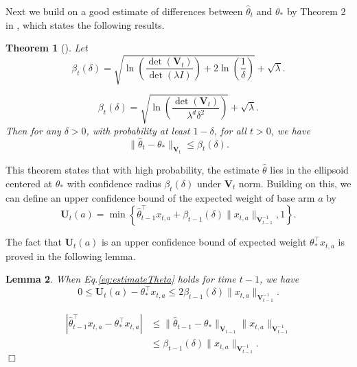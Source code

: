 \documentclass{article}
\newcommand{\bU}{\mathbf{U}}
\newcommand{\bV}{\mathbf{V}}
\newcommand{\abs}[1]{\left| #1 \right|}
\newcommand{\norm}[1]{\| #1 \|}
\newtheorem{theorem}{Theorem}[section]
\newtheorem{lemma}[theorem]{Lemma}%
\newenvironment{proof}{\noindent {\textbf{Proof. }}}{$\Box$ \medskip}
\newcommand{\wei}[1]{}
\newcommand{\wei}[1]{{\color{blue!50!black}  [\text{Wei:} #1]}}
\begin{document}
Next we build on a good estimate of differences between $\hat{\theta}_t$ and $\theta_*$ by Theorem 2 in \cite{abbasi2011improved}, which states the following results.
	
\begin{theorem}[\cite{abbasi2011improved}]
\label{thm:theta_estimate}
Let 
$$
\beta_{t}(\delta) = \sqrt{\ln\left(\frac{\det(\bV_{t})}{\det(\lambda I)}\right) + 2 \ln\left(\frac{1}{\delta}\right)} + \sqrt{\lambda}.
$$
\wei{I thought the following is simpler. Should we use the following?}
$$
\beta_{t}(\delta) = \sqrt{\ln\left(\frac{\det(\bV_{t})}{\lambda^d \delta^2}\right)} + \sqrt{\lambda}.
$$
Then for any $\delta > 0$, with probability at least $1 - \delta$, for all $t > 0$, we have
\begin{equation}
\label{eq:estimateTheta}
\norm{\hat{\theta}_t - \theta_{\ast}}_{\bV_{t}} \leq \beta_{t}(\delta).
\end{equation}
\end{theorem}

This theorem states that with high probability, the estimate $\hat{\theta}$ lies in the ellipsoid centered at $\theta_*$  with confidence radius $\beta_t(\delta)$ under $\bV_t$ norm. Building on this, we can define an upper confidence bound of the expected weight of base arm $a$ by
\begin{equation}
\label{eq:defU}
\bU_t(a) = \min\left\{\hat{\theta}_{t-1}^{\top}x_{t,a} + \beta_{t-1}(\delta)\norm{x_{t,a}}_{\bV_{t-1}^{-1}}, 1 \right\}.
\end{equation}

The fact that $\bU_t(a)$ is an upper confidence bound of expected weight $\theta_*^{\top}x_{t,a}$ is proved in the following lemma.
\begin{lemma}
\label{lem:estimateU}
When Eq.\eqref{eq:estimateTheta} holds for time $t-1$, we have
$$
0 \leq \bU_t(a) - \theta_{\ast}^{\top}x_{t,a} \leq 2\beta_{t-1}(\delta)\norm{x_{t,a}}_{\bV_{t-1}^{-1}}.
$$
\end{lemma}
\begin{proof}
\begin{align*}
\abs{\hat{\theta}_{t-1}^{\top}x_{t,a} - \theta_{\ast}^{\top}x_{t,a}} &\leq \norm{\hat{\theta}_{t-1} - \theta_{\ast}}_{\bV_{t-1}} \norm{x_{t,a}}_{\bV_{t-1}^{-1}} \\
&\leq \beta_{t-1}(\delta)\norm{x_{t,a}}_{\bV_{t-1}^{-1}}.
\end{align*}
\end{proof}
\end{document}
